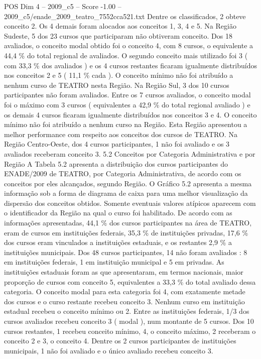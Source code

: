 \begin{textsample}{POS Dim 4 – 2009\_c5 – Score -1.00 – 2009\_c5/enade\_2009\_teatro\_7552cca521.txt}
Dentre os classificados, 2 obteve conceito 2.
Os 4 demais foram alocados aos conceitos 1, 3, 4 e 5.
Na Região Sudeste, 5 dos 23 cursos que participaram não obtiveram conceito.
Dos 18 avaliados, o conceito modal obtido foi o conceito 4, com 8 cursos, o equivalente a 44,4 \% do total regional de avaliados.
O segundo conceito mais utilizado foi 3 ( com 33,3 \% dos avaliados ) e os 4 cursos restantes ficaram igualmente distribuídos nos conceitos 2 e 5 ( 11,1 \% cada ).
O conceito mínimo não foi atribuído a nenhum curso de TEATRO nesta Região.
Na Região Sul, 3 dos 10 cursos participantes não foram avaliados.
Entre os 7 cursos avaliados, o conceito modal foi o máximo com 3 cursos ( equivalentes a 42,9 \% do total regional avaliado ) e os demais 4 cursos ficaram igualmente distribuídos nos conceitos 3 e 4.
O conceito mínimo não foi atribuído a nenhum curso na Região.
Esta Região apresentou a melhor performance com respeito aos conceitos dos cursos de TEATRO.
Na Região Centro-Oeste, dos 4 cursos participantes, 1 não foi avaliado e os 3 avaliados receberam conceito 3. 5.2 Conceitos por Categoria Administrativa e por Região A Tabela 5.2 apresenta a distribuição dos cursos participantes do ENADE/2009 de TEATRO, por Categoria Administrativa, de acordo com os conceitos por eles alcançados, segundo Região.
O Gráfico 5.2 apresenta a mesma informação sob a forma de diagrama de caixa para uma melhor visualização da dispersão dos conceitos obtidos.
Somente eventuais valores atípicos aparecem com o identificador da Região na qual o curso foi habilitado.
De acordo com as informações apresentadas, 44,1 \% dos cursos participantes na área de TEATRO, eram de cursos em instituições federais, 35,3 \% de instituições privadas, 17,6 \% dos cursos eram vinculados a instituições estaduais, e os restantes 2,9 \% a instituições municipais.
Dos 48 cursos participantes, 14 não foram avaliados : 8 em instituições federais, 1 em instituição municipal e 5 em privadas.
As instituições estaduais foram as que apresentaram, em termos nacionais, maior proporção de cursos com conceito 5, equivalentes a 33,3 \% do total avaliado dessa categoria.
O conceito modal para esta categoria foi 4, com exatamente metade dos cursos e o curso restante recebeu conceito 3.
Nenhum curso em instituição estadual recebeu o conceito mínimo ou 2.
Entre as instituições federais, 1/3 dos cursos avaliados recebeu conceito 3 ( modal ), num montante de 5 cursos.
Dos 10 cursos restantes, 1 recebeu conceito mínimo, 4, o conceito máximo, 2 receberam o conceito 2 e 3, o conceito 4.
Dentre os 2 cursos participantes de instituições municipais, 1 não foi avaliado e o único avaliado recebeu conceito 3.

\end{textsample}
